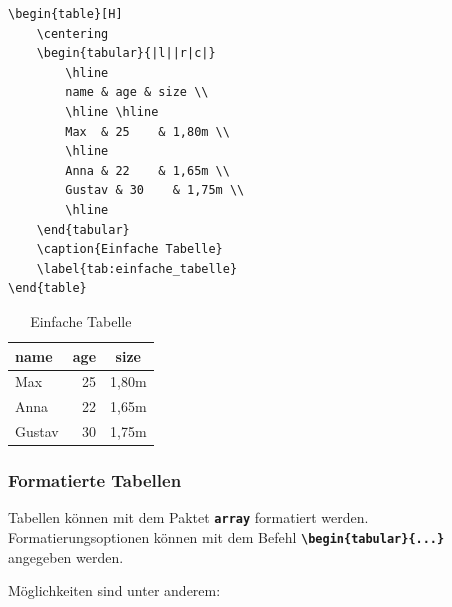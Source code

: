 \begin{minipage}{0.5\textwidth}
    \begin{lstlisting}[language={[LaTeX]TeX}]
\begin{table}[H]
    \centering
    \begin{tabular}{|l||r|c|}
        \hline
        name & age & size \\
        \hline \hline
        Max  & 25    & 1,80m \\
        \hline
        Anna & 22    & 1,65m \\
        Gustav & 30    & 1,75m \\
        \hline
    \end{tabular}
    \caption{Einfache Tabelle}
    \label{tab:einfache_tabelle}
\end{table}
\end{lstlisting}
\end{minipage}
\hfill
\begin{minipage}{0.5\textwidth}
    \begin{table}[H]
        \centering
        \begin{tabular}{|l||r|c|}
            \hline
            name   & age & size  \\
            \hline \hline
            Max    & 25  & 1,80m \\
            \hline
            Anna   & 22  & 1,65m \\
            Gustav & 30  & 1,75m \\
            \hline
        \end{tabular}
        \caption{Einfache Tabelle}
        \label{tab:einfache_tabelle}
    \end{table}
\end{minipage}

\subsubsection{Formatierte Tabellen}
Tabellen können mit dem Paktet \textbf{\texttt{array}} formatiert werden.
Formatierungsoptionen können mit dem Befehl \textbf{\texttt{\textbackslash begin\{tabular\}\{...\}}} angegeben werden.

Möglichkeiten sind unter anderem:

